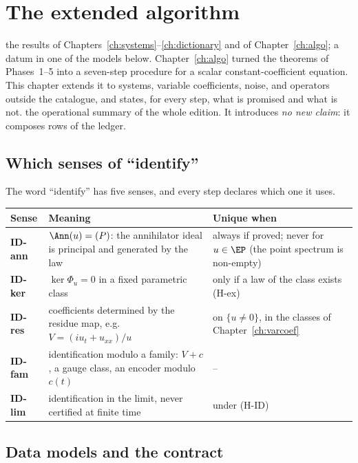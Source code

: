 \chapter{The extended algorithm}\label{ch:extalgo}
\chapterbrief
{the results of Chapters~\ref{ch:systems}--\ref{ch:dictionary} and of Chapter~\ref{ch:algo}; a datum in one of the models below.}
{Chapter~\ref{ch:algo} turned the theorems of Phases~1--5 into a seven-step procedure for a scalar constant-coefficient equation. This chapter extends it to systems, variable coefficients, noise, and operators outside the catalogue, and states, for every step, what is promised and what is not.}
{the operational summary of the whole edition. It introduces \emph{no new claim}: it composes rows of the ledger.}

\section{Which senses of ``identify''}

The word ``identify'' has five senses, and every step declares which one it uses.

\begin{center}\small
\begin{tabular}{@{}L{1.7cm}L{7.3cm}L{5.4cm}@{}}
\toprule
Sense & Meaning & Unique when\\\midrule
\textbf{ID-ann} & $\Ann(u)=(P)$: the annihilator ideal is principal and generated by the law & always if proved; never for $u\in\EP$ (the point spectrum is non-empty)\\
\textbf{ID-ker} & $\ker\Phi_u=0$ in a fixed parametric class & only if a law of the class exists (H-ex)\\
\textbf{ID-res} & coefficients determined by the residue map, e.g.\ $V=(iu_t+u_{xx})/u$ & on $\{u\ne0\}$, in the classes of Chapter~\ref{ch:varcoef}\\
\textbf{ID-fam} & identification modulo a family: $V+c$, a gauge class, an encoder modulo $c(t)$ & --\\
\textbf{ID-lim} & identification in the limit, never certified at finite time & under (H-ID)\\\bottomrule
\end{tabular}
\end{center}

\section{Data models and the contract}

